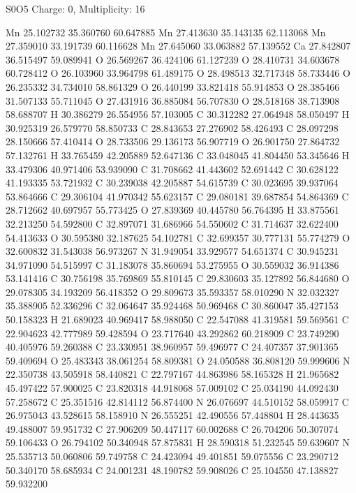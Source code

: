 \documentclass{article}
\begin{document}
S0O5   Charge: 0, Multiplicity: 16      
    
Mn 25.102732 35.360760 60.647885 
Mn 27.413630 35.143135 62.113068 
Mn 27.359010 33.191739 60.116628 
Mn 27.645060 33.063882 57.139552 
Ca 27.842807 36.515497 59.089941 
O 26.569267 36.424106 61.127239 
O 28.410731 34.603678 60.728412 
O 26.103960 33.964798 61.489175 
O 28.498513 32.717348 58.733446 
O 26.235332 34.734010 58.861329 
O 26.440199 33.821418 55.914853 
O 28.385466 31.507133 55.711045 
O 27.431916 36.885084 56.707830 
O 28.518168 38.713908 58.688707 
H 30.386279 26.554956 57.103005 
C 30.312282 27.064948 58.050497 
H 30.925319 26.579770 58.850733 
C 28.843653 27.276902 58.426493 
C 28.097298 28.150666 57.410414 
O 28.733506 29.136173 56.907719 
O 26.901750 27.864732 57.132761 
H 33.765459 42.205889 52.647136 
C 33.048045 41.804450 53.345646 
H 33.479306 40.971406 53.939090 
C 31.708662 41.443602 52.691442 
C 30.628122 41.193335 53.721932 
C 30.239038 42.205887 54.615739 
C 30.023695 39.937064 53.864666 
C 29.306104 41.970342 55.623157 
C 29.080181 39.687854 54.864369 
C 28.712662 40.697957 55.773425 
O 27.839369 40.445780 56.764395 
H 33.875561 32.213250 54.592800 
C 32.897071 31.686966 54.550602 
C 31.714637 32.622400 54.413633 
O 30.595380 32.187625 54.102781 
C 32.699357 30.777131 55.774279 
O 32.600832 31.543038 56.973267 
N 31.949054 33.929577 54.651374 
C 30.945231 34.971090 54.515997 
C 31.183078 35.860694 53.275955 
O 30.559032 36.914386 53.141416 
C 30.756198 35.769869 55.810145 
C 29.830603 35.127892 56.844680 
O 29.078305 34.193209 56.418352 
O 29.809673 35.593357 58.010290 
N 32.032327 35.388905 52.336296 
C 32.064647 35.924468 50.969468 
C 30.860047 35.427153 50.158323 
H 21.689023 40.969417 58.988050 
C 22.547088 41.319581 59.569561 
C 22.904623 42.777989 59.428594 
O 23.717640 43.292862 60.218909 
C 23.749290 40.405976 59.260388 
C 23.330951 38.960957 59.496977 
C 24.407357 37.901365 59.409694 
O 25.483343 38.061254 58.809381 
O 24.050588 36.808120 59.999606 
N 22.350738 43.505918 58.440821 
C 22.797167 44.863986 58.165328 
H 21.965682 45.497422 57.900025 
C 23.820318 44.918068 57.009102 
C 25.034190 44.092430 57.258672 
C 25.351516 42.814112 56.874400 
N 26.076697 44.510152 58.059917 
C 26.975043 43.528615 58.158910 
N 26.555251 42.490556 57.448804 
H 28.443635 49.488007 59.951732 
C 27.906209 50.447117 60.002688 
C 26.704206 50.307074 59.106433 
O 26.794102 50.340948 57.875831 
H 28.590318 51.232545 59.639607 
N 25.535713 50.060806 59.749758 
C 24.423094 49.401851 59.075556 
C 23.290712 50.340170 58.685934 
C 24.001231 48.190782 59.908026 
C 25.104550 47.138827 59.932200 
\end{document}
